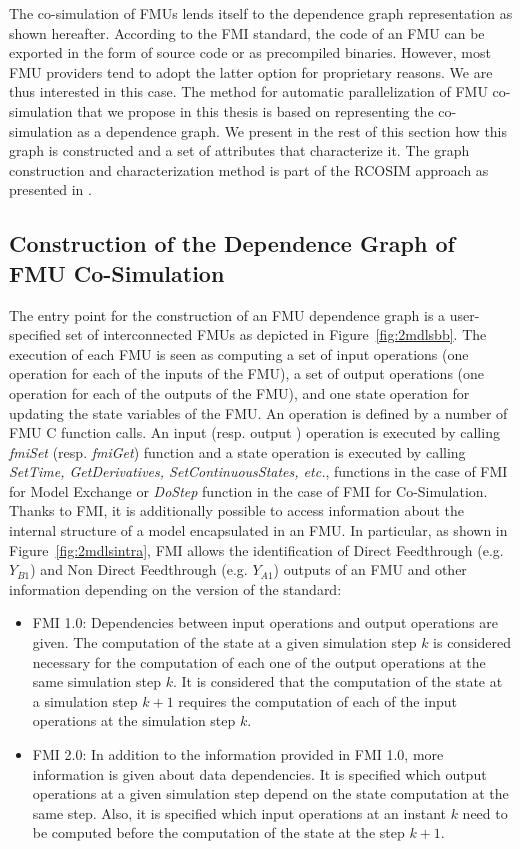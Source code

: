 The co-simulation of FMUs lends itself to the dependence graph representation as shown hereafter. According to the FMI standard, the code of an FMU can be exported in the form of source code or as precompiled binaries. However, most FMU providers tend to adopt the latter option for proprietary reasons. We are thus interested in this case. The method for automatic parallelization of FMU co-simulation that we propose in this thesis is based on representing the co-simulation as a dependence graph. We present in the rest of this section how this graph is constructed and a set of attributes that characterize it. The graph construction and characterization method is part of the RCOSIM approach as presented in \cite{benkhaled:2014}.

\subsection{Construction of the Dependence Graph of FMU Co-Simulation}

The entry point for the construction of an FMU dependence graph is a user-specified set of interconnected FMUs as depicted in Figure~\ref{fig:2mdlsbb}. The execution of each FMU is seen as computing a set of input operations (one operation for each of the inputs of the FMU), a set of output operations (one operation for each of the outputs of the FMU), and one state operation for updating the state variables of the FMU. An operation is defined by a number of FMU C function calls. An input (resp. output ) operation is executed by calling \textit{fmiSet} (resp. \textit{fmiGet}) function and a state operation is executed by calling \textit{SetTime, GetDerivatives, SetContinuousStates, etc.}, functions in the case of FMI for Model Exchange or \textit{DoStep} function in the case of FMI for Co-Simulation. Thanks to FMI, it is additionally possible to access information about the internal structure of a model encapsulated in an FMU. In particular, as shown in Figure~\ref{fig:2mdlsintra}, FMI allows the identification of Direct Feedthrough (e.g. $Y_{B1}$) and Non Direct Feedthrough (e.g. $Y_{A1}$) outputs of an FMU and other information depending on the version of the standard:

\begin{itemize}
\item FMI 1.0: Dependencies between input operations and output operations are given. The computation of the state at a given simulation step $k$ is considered necessary for the computation of each one of the output operations at the same simulation step $k$. It is considered that the computation of the state at a simulation step $k+1$ requires the computation of each of the input operations at the simulation step $k$.
\item FMI 2.0: In addition to the information provided in FMI 1.0, more information is given about data dependencies. It is specified which output operations at a given simulation step depend on the state computation at the same step. Also, it is specified which input operations at an instant $k$ need to be computed before the computation of the state at the step $k+1$.  
\end{itemize}

